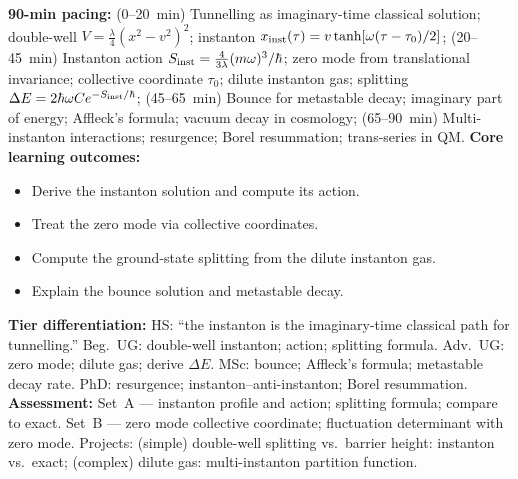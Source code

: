 \documentclass[11pt,a4paper]{article}
\begin{document}
\begin{tcolorbox}[modulebox, title={Module~II.2 / L08: Instantons and Quantum Tunnelling}]
\textbf{90-min pacing:} (0--20~min) Tunnelling as imaginary-time classical solution; double-well $V=\tfrac{\lambda}{4}(x^2-v^2)^2$; instanton $x_{\rm inst}(\tau)=v\tanh[\omega(\tau-\tau_0)/2]$; (20--45~min) Instanton action $S_{\rm inst}=\tfrac{4}{3\lambda}(m\omega)^3/\hbar$; zero mode from translational invariance; collective coordinate $\tau_0$; dilute instanton gas; splitting $\Delta E=2\hbar\omega C e^{-S_{\rm inst}/\hbar}$; (45--65~min) Bounce for metastable decay; imaginary part of energy; Affleck's formula; vacuum decay in cosmology; (65--90~min) Multi-instanton interactions; resurgence; Borel resummation; trans-series in QM.
\medskip\textbf{Core learning outcomes:}
\begin{itemize}[leftmargin=1.4em,topsep=2pt,itemsep=1pt]
  \item Derive the instanton solution and compute its action.
  \item Treat the zero mode via collective coordinates.
  \item Compute the ground-state splitting from the dilute instanton gas.
  \item Explain the bounce solution and metastable decay.
\end{itemize}
\medskip\textbf{Tier differentiation:}
HS: ``the instanton is the imaginary-time classical path for tunnelling.''
Beg.\ UG: double-well instanton; action; splitting formula.
Adv.\ UG: zero mode; dilute gas; derive $\Delta E$.
MSc: bounce; Affleck's formula; metastable decay rate.
PhD: resurgence; instanton--anti-instanton; Borel resummation.
\medskip\textbf{Assessment:}
Set~A --- instanton profile and action; splitting formula; compare to exact.
Set~B --- zero mode collective coordinate; fluctuation determinant with zero mode.
Projects: (simple) double-well splitting vs.\ barrier height: instanton vs.\ exact; (complex) dilute gas: multi-instanton partition function.
\end{tcolorbox}

\medskip
\end{document}
